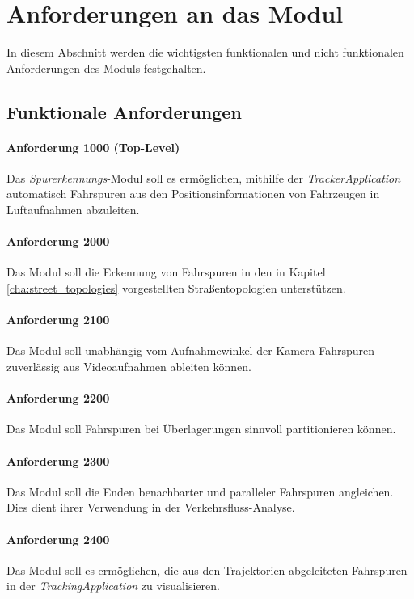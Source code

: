 \section{Anforderungen an das Modul}
\label{sec:requirements}

In diesem Abschnitt werden die wichtigsten funktionalen und nicht funktionalen Anforderungen
des Moduls festgehalten.

\subsection{Funktionale Anforderungen}

\paragraph{Anforderung 1000 (Top-Level)}
Das \textit{Spurerkennungs}-Modul soll es ermöglichen, mithilfe der \textit{TrackerApplication}
automatisch Fahrspuren aus den Positionsinformationen von Fahrzeugen in Luftaufnahmen abzuleiten.

\paragraph{Anforderung 2000}
Das Modul soll die Erkennung von Fahrspuren in den in Kapitel \ref{cha:street_topologies} vorgestellten
Straßentopologien unterstützen.

\paragraph{Anforderung 2100}
Das Modul soll unabhängig vom Aufnahmewinkel der Kamera Fahrspuren zuverlässig aus Videoaufnahmen ableiten können. 

\paragraph{Anforderung 2200}
Das Modul soll Fahrspuren bei Überlagerungen sinnvoll partitionieren können.

\paragraph{Anforderung 2300}
Das Modul soll die Enden benachbarter und paralleler Fahrspuren angleichen. Dies dient ihrer Verwendung in der
Verkehrsfluss-Analyse.

\paragraph{Anforderung 2400}
Das Modul soll es ermöglichen, die aus den Trajektorien abgeleiteten Fahrspuren in der \textit{TrackingApplication}
zu visualisieren.

